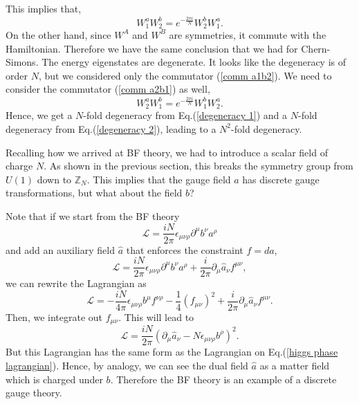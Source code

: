 \documentclass{article}
\begin{document}
This implies that,
\begin{equation}\label{degeneracy 1}
	W_1^aW_2^b=e^{-\frac{2\pi i}{N}}W_2^bW_1^a.
\end{equation}
On the other hand, since $W^A$ and $W^B$ are symmetries, it commute with the Hamiltonian. Therefore we have the same conclusion that we had for Chern-Simons. The energy  eigenstates are degenerate. It looks like the degeneracy is of order $N$, but we considered only the commutator (\ref{comm a1b2}). We need to consider the commutator (\ref{comm a2b1}) as well, 
\begin{equation}\label{degeneracy 2}
	W_2^aW_1^b=e^{-\frac{2\pi i}{N}}W_1^bW_2^a.
\end{equation}
Hence, we get a $N$-fold degeneracy from Eq.(\ref{degeneracy 1}) and a $N$-fold degeneracy from Eq.(\ref{degeneracy 2}), leading to a $N^2$-fold degeneracy. 


Recalling how we arrived at BF theory, we had to introduce a scalar field of charge $N$. As shown in the previous section, this breaks the symmetry group from $U(1)$ down to $\mathbb{Z}_N$. This implies that the gauge field $a$ has discrete gauge transformations, but what about the field $b$?

Note that if we start from the BF theory
\begin{equation}
	\mathcal{L} = \frac{iN}{2\pi}\epsilon_{\mu\nu\rho}\partial^{\mu}b^\nu a^\rho
\end{equation}
and add an auxiliary field $\hat{a}$ that enforces the constraint $f=da$, 
\begin{equation}
	\mathcal{L} = \frac{iN}{2\pi}\epsilon_{\mu\nu\rho}\partial^{\mu}b^\nu a^\rho + \frac{i}{2\pi}\partial_\mu\hat{a}_\nu f^{\mu\nu},
\end{equation}
we can rewrite the Lagrangian as 
\begin{equation}
	\mathcal{L} = -\frac{iN}{4\pi}\epsilon_{\mu\nu\rho} b^{\mu}f^{\nu\rho} - \frac{1}{4}(f_{\mu\nu})^2 + \frac{i}{2\pi}\partial_{\mu}\hat{a}_\nu f^{\mu\nu}. 
\end{equation}
Then, we integrate out $f_{\mu\nu}$. This will lead to 
\begin{equation}
	\mathcal{L} = \frac{iN}{2\pi}(\partial_\mu\hat{a}_\nu-N\epsilon_{\mu\nu\rho}b^\rho)^2. 
\end{equation}
But this Lagrangian has the same form as the Lagrangian on Eq.(\ref{higgs phase lagrangian}). Hence, by analogy, we can see the dual field $\hat{a}$ as a matter field which is charged under $b$. Therefore the BF theory is an example of a discrete gauge theory. 



\end{document}
